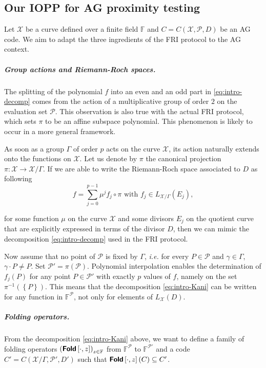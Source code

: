 \documentclass[10pt,a4paper]{article}
\newcommand\F{\mathbb{F}}
\newcommand\fold[1]{\textsf{\textbf{Fold}}\left[#1\right]}
\newcommand{\set}[1]{\left\{#1\right\}}
\newcommand\calX{\mathcal{X}}
\newcommand\calP{\mathcal{P}}
\theoremstyle{plain}
\theoremstyle{plain}
\theoremstyle{definition}
\theoremstyle{remark}
\theoremstyle{plain}
\begin{document}
\subsection{Our IOPP for AG proximity testing}\label{subsec:AG-IOPP-hyp}

Let $\calX$ be a curve defined over a finite field $\F$ and $C=C(\calX,\calP,D)$ be an AG code. We aim to adapt the three ingredients of the \textsf{FRI} protocol to the AG context.

\subparagraph*{Group actions and Riemann-Roch spaces.}
The splitting of the polynomial $f$ into an even and an odd part in \eqref{eq:intro-decomp} comes from the action of a multiplicative group of order $2$ on the evaluation set $\calP$. This observation is also true with the actual \textsf{FRI} protocol, which sets $\pi$ to be an affine subspace polynomial. This phenomenon is likely to occur in a more general framework.

As soon as a group $\Gamma$ of order $p$ acts on the curve $\calX$, its action naturally extends onto the functions on $\calX$. Let us denote by $\pi$ the canonical projection $\pi : \calX \rightarrow \calX / \Gamma$. If we are able to write the Riemann-Roch space associated to $D$ as following
\begin{equation}\tag{$\star$}\label{eq:intro-Kani}
	f= \sum_{j=0}^{p-1} \mu^j f_j \circ \pi \text{ with } f_j \in L_{\calX / \Gamma}(E_j),
\end{equation}

for some function $\mu$ on the curve $\calX$ and some divisors $E_j$ on the quotient curve that are explicitly expressed in terms of the divisor $D$, then we can mimic the decomposition \eqref{eq:intro-decomp} used in the \textsf{FRI} protocol.


Now assume that no point of $\calP$ is fixed by $\Gamma$, \textit{i.e.} for every $P \in \calP$ and $\gamma \in \Gamma$, $\gamma \cdot P \neq P$. Set $\calP'=\pi(\calP)$.
Polynomial interpolation enables the determination of $f_j(P)$ for any point $P \in \calP'$ with exactly $p$ values of $f$, namely on the set $\pi^{-1}(\set{P})$. This means that the decomposition \eqref{eq:intro-Kani} can be written for any function in $\F^\calP$, not only for elements of $L_\calX(D)$.


\subparagraph*{Folding operators.}
From the decomposition \eqref{eq:intro-Kani} above, we want to define a family of folding operators $\left(\fold{\cdot,z}\right)_{z \in \F}$ from $\F^\calP$ to $\F^{\calP'}$ and a code $C'=C(\calX/\Gamma,\calP',D')$ such that ${\fold{\cdot,z}(C) \subseteq C'}$.
\end{document}
